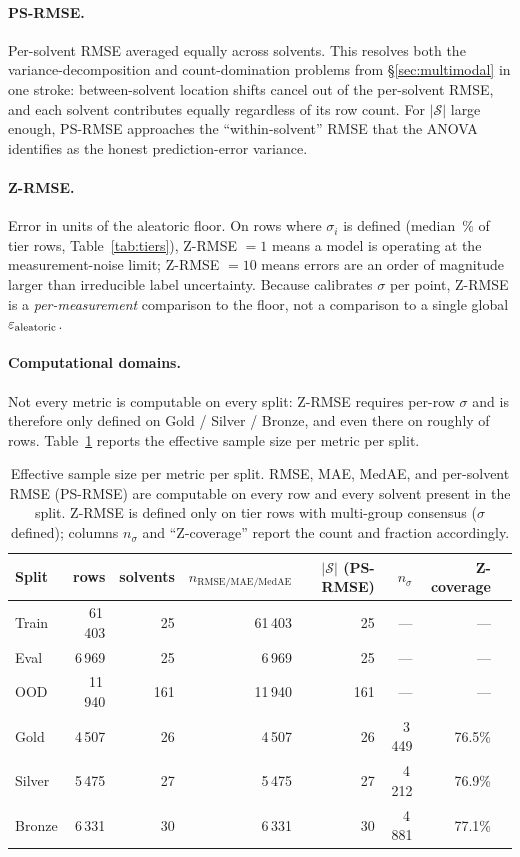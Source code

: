 \paragraph{PS-RMSE.}  Per-solvent RMSE averaged equally across
solvents.  This resolves both the variance-decomposition and
count-domination problems from §\ref{sec:multimodal} in one stroke:
between-solvent location shifts cancel out of the per-solvent RMSE,
and each solvent contributes equally regardless of its row count.
For $|\mathcal{S}|$ large enough, PS-RMSE approaches the
``within-solvent'' RMSE that the ANOVA identifies as the honest
prediction-error variance.

\paragraph{Z-RMSE.}  Error in units of the aleatoric floor.  On rows
where $\sigma_i$ is defined (median \,\% of tier rows,
Table~\ref{tab:tiers}), Z-RMSE $= 1$ means a model is operating at
the measurement-noise limit; Z-RMSE $= 10$ means errors are an order
of magnitude larger than irreducible label uncertainty.  Because
\scthree{} calibrates $\sigma$ per point, Z-RMSE is a
\emph{per-measurement} comparison to the floor, not a comparison to
a single global $\varepsilon_{\text{aleatoric}}$.

\paragraph{Computational domains.}
Not every metric is computable on every split: Z-RMSE requires
per-row $\sigma$ and is therefore only defined on Gold / Silver /
Bronze, and even there on roughly  of rows.
Table~\ref{tab:metric_domain} reports the effective sample size per
metric per split.

\begin{table}[h]
\centering\small
\caption{Effective sample size per metric per split.  RMSE, MAE, MedAE,
and per-solvent RMSE (PS-RMSE) are computable on every row and every
solvent present in the split.  Z-RMSE is defined only on tier rows
with multi-group consensus ($\sigma$ defined); columns $n_{\sigma}$ and
``Z-coverage'' report the count and fraction accordingly.}
\label{tab:metric_domain}
\begin{tabular}{@{}lrrrrrrr@{}}
\toprule
Split  & rows   & solvents & $n_{\mathrm{RMSE/MAE/MedAE}}$ & $|\mathcal{S}|$ (PS-RMSE) &
         $n_{\sigma}$ & Z-coverage \\
\midrule
Train  & 61\,403 &  25 & 61\,403 &  25 & ---   & ---    \\
Eval   &  6\,969 &  25 &  6\,969 &  25 & ---   & ---    \\
OOD    & 11\,940 & 161 & 11\,940 & 161 & ---   & ---    \\
Gold   &  4\,507 &  26 &  4\,507 &  26 & 3\,449 & 76.5\% \\
Silver &  5\,475 &  27 &  5\,475 &  27 & 4\,212 & 76.9\% \\
Bronze &  6\,331 &  30 &  6\,331 &  30 & 4\,881 & 77.1\% \\
\bottomrule
\end{tabular}
\end{table}

